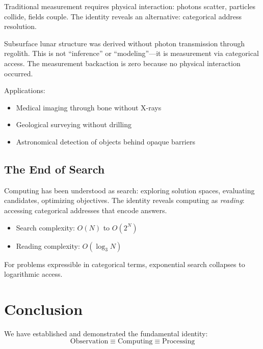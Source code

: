 \documentclass[12pt,a4paper]{article}
\theoremstyle{definition}
\theoremstyle{remark}
\begin{document}
Traditional measurement requires physical interaction: photons scatter, particles collide, fields couple. The identity reveals an alternative: categorical address resolution.

Subsurface lunar structure was derived without photon transmission through regolith. This is not ``inference'' or ``modeling''---it is measurement via categorical access. The measurement backaction is zero because no physical interaction occurred.

Applications:
\begin{itemize}
    \item Medical imaging through bone without X-rays
    \item Geological surveying without drilling
    \item Astronomical detection of objects behind opaque barriers
\end{itemize}

\subsection{The End of Search}

Computing has been understood as search: exploring solution spaces, evaluating candidates, optimizing objectives. The identity reveals computing as \emph{reading}: accessing categorical addresses that encode answers.

\begin{itemize}
    \item Search complexity: $O(N)$ to $O(2^N)$
    \item Reading complexity: $O(\log_3 N)$
\end{itemize}

For problems expressible in categorical terms, exponential search collapses to logarithmic access.

\section{Conclusion}
\label{sec:conclusion}

We have established and demonstrated the fundamental identity:
\begin{equation}
\boxed{\text{Observation} \equiv \text{Computing} \equiv \text{Processing}}
\end{equation}
\end{document}
